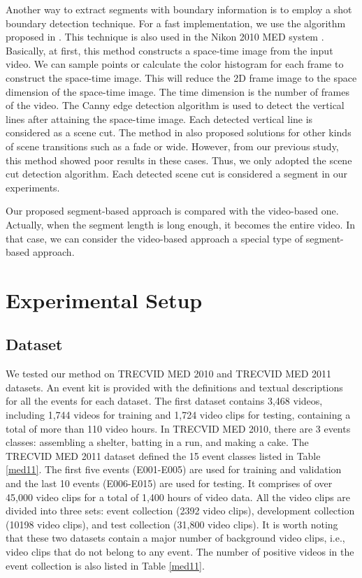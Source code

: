 Another way to extract segments with boundary information is to employ a shot boundary detection technique. For a fast implementation, we use the algorithm proposed in \cite{Guimaraes:2003}. This technique is also used in the Nikon 2010 MED system \cite{DBLP:conf/trecvid/MatsuoN10}. Basically, at first, this method constructs a space-time image from the input video. We can sample points or calculate the color histogram for each frame to construct the space-time image. This will reduce the 2D frame image to the space dimension of the space-time image. The time dimension is the number of frames of the video. The Canny edge detection algorithm is used to detect the vertical lines after attaining the space-time image. Each detected vertical line is considered as a scene cut. The method in \cite{Guimaraes:2003} also proposed solutions for other kinds of scene transitions such as a fade or wide. However, from our previous study, this method showed poor results in these cases. Thus, we only adopted the scene cut detection algorithm. Each detected scene cut is considered a segment in our experiments. 

Our proposed segment-based approach is compared with the video-based one. Actually, when the segment length is long enough, it becomes the entire video. In that case, we can consider the video-based approach a special type of segment-based approach.
\section{Experimental Setup}
\label{experimentalsetup}
\subsection{Dataset}
\label{experimentalsetup:1}
We tested our method on TRECVID MED 2010 and TRECVID MED 2011 datasets. An event kit is provided with the definitions and textual descriptions for all the events for each dataset. The first dataset contains 3,468 videos, including 1,744 videos for training and 1,724 video clips for testing, containing a total of more than 110 video hours. In TRECVID MED 2010, there are 3 events classes: assembling a shelter, batting in a run, and making a cake. The TRECVID MED 2011 dataset defined the 15 event classes listed in Table \ref{med11}. The first five events (E001-E005) are used for training and validation and the last 10 events (E006-E015) are used for testing. It comprises of over 45,000 video clips for a total of 1,400 hours of video data. All the video clips are divided into three sets: event collection (2392 video clips), development collection (10198 video clips), and test collection (31,800 video clips). It is worth noting that these two datasets contain a major number of background video clips, i.e., video clips that do not belong to any event. The number of positive videos in the event collection is also listed in Table \ref{med11}.

